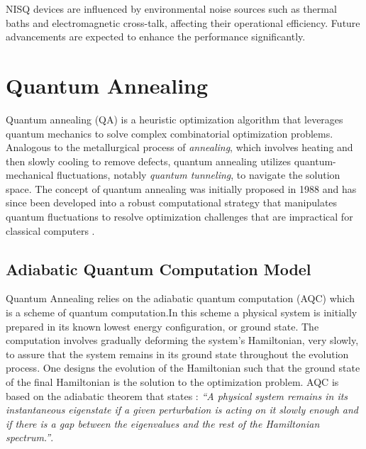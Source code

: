 NISQ devices are influenced by environmental noise sources such as thermal baths and electromagnetic cross-talk, affecting their operational efficiency. Future advancements are expected to enhance the performance significantly.



\section{Quantum Annealing}

Quantum annealing (QA) is a heuristic optimization algorithm that leverages quantum mechanics to solve complex combinatorial optimization problems. Analogous to the metallurgical process of \textit{annealing}, which involves heating and then slowly cooling to remove defects, quantum annealing utilizes quantum-mechanical fluctuations, notably \textit{quantum tunneling}, to navigate the solution space. %
The concept of quantum annealing was initially proposed in 1988 and has since been developed into a robust computational strategy that manipulates quantum fluctuations to resolve optimization challenges that are impractical for classical computers \cite{QAKadowaki1998QuantumAI}.
\subsection{Adiabatic Quantum Computation Model}

Quantum Annealing relies on the adiabatic quantum computation (AQC) which is a scheme of quantum computation.In this scheme a physical system is initially
prepared in its known lowest energy configuration, or ground state. The computation
involves gradually deforming the system’s Hamiltonian, very slowly, to assure that the
system remains in its ground state throughout the evolution process. One designs the
evolution of the Hamiltonian such that the ground state of the final Hamiltonian is the
solution to the optimization problem. AQC is based on the adiabatic theorem that states \cite{Tanaka2017QuantumSG}:
\textit{“A physical system remains in its instantaneous eigenstate if a given perturbation is
acting on it slowly enough and if there is a gap between the eigenvalues and the rest of the
Hamiltonian spectrum.”}. 

